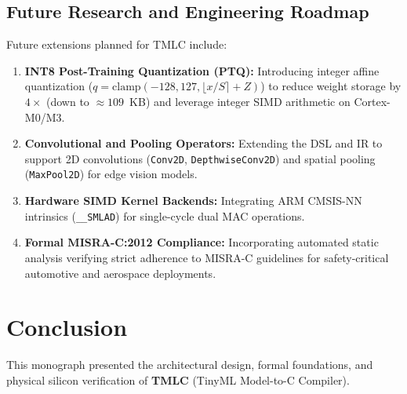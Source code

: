 \documentclass[11pt,a4paper]{article}
\begin{document}
\subsection{Future Research and Engineering Roadmap}
Future extensions planned for TMLC include:
\begin{enumerate}
    \item \textbf{INT8 Post-Training Quantization (PTQ):} Introducing integer affine quantization ($q = \text{clamp}(-128, 127, \lfloor x/S \rceil + Z)$) to reduce weight storage by $4\times$ (down to $\approx 109$~KB) and leverage integer SIMD arithmetic on Cortex-M0/M3.
    \item \textbf{Convolutional and Pooling Operators:} Extending the DSL and IR to support 2D convolutions (\texttt{Conv2D}, \texttt{DepthwiseConv2D}) and spatial pooling (\texttt{MaxPool2D}) for edge vision models.
    \item \textbf{Hardware SIMD Kernel Backends:} Integrating ARM CMSIS-NN intrinsics (\texttt{\_\_SMLAD}) for single-cycle dual MAC operations.
    \item \textbf{Formal MISRA-C:2012 Compliance:} Incorporating automated static analysis verifying strict adherence to MISRA-C guidelines for safety-critical automotive and aerospace deployments.
\end{enumerate}

\section{Conclusion}
\label{sec:conclusion}

This monograph presented the architectural design, formal foundations, and physical silicon verification of \textbf{TMLC} (TinyML Model-to-C Compiler). 
\end{document}
